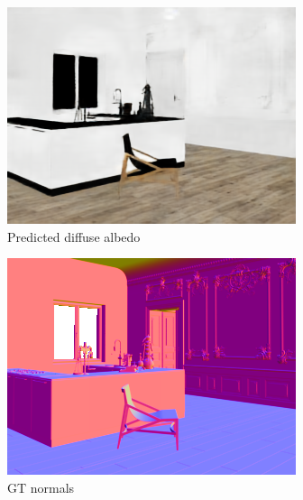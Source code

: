 \begin{figure}
\begin{subfigure}{0.32\linewidth}
    \includegraphics[width=\linewidth]{praca/images/AI43_004_Cam02.albedo_output.png}
    \caption{Predicted diffuse albedo}
  \end{subfigure}
  \begin{subfigure}{0.32\linewidth}
    \includegraphics[width=\linewidth]{praca/images/AI43_004_Cam02.normal.png}
    \caption{GT normals}
  \end{subfigure}
  \begin{subfigure}{0.32\linewidth}

\end{subfigure}
\end{figure}
